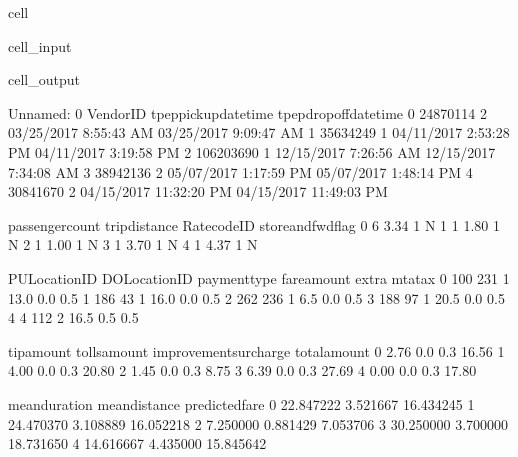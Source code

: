 \documentclass[letterpaper,10pt,english]{sphinxmanual}
\begin{document}
\begin{sphinxuseclass}{cell}
\begin{sphinxuseclass}{cell_input}
\begin{sphinxVerbatim}[commandchars=\\\{\}]
\end{sphinxVerbatim}

\end{sphinxuseclass}
\begin{sphinxuseclass}{cell_output}
\begin{sphinxVerbatim}[commandchars=\\\{\}]
   Unnamed: 0  VendorID    tpep\PYGZus{}pickup\PYGZus{}datetime   tpep\PYGZus{}dropoff\PYGZus{}datetime  \PYGZbs{}
0    24870114         2   03/25/2017 8:55:43 AM   03/25/2017 9:09:47 AM   
1    35634249         1   04/11/2017 2:53:28 PM   04/11/2017 3:19:58 PM   
2   106203690         1   12/15/2017 7:26:56 AM   12/15/2017 7:34:08 AM   
3    38942136         2   05/07/2017 1:17:59 PM   05/07/2017 1:48:14 PM   
4    30841670         2  04/15/2017 11:32:20 PM  04/15/2017 11:49:03 PM   

   passenger\PYGZus{}count  trip\PYGZus{}distance  RatecodeID store\PYGZus{}and\PYGZus{}fwd\PYGZus{}flag  \PYGZbs{}
0                6           3.34           1                  N   
1                1           1.80           1                  N   
2                1           1.00           1                  N   
3                1           3.70           1                  N   
4                1           4.37           1                  N   

   PULocationID  DOLocationID  payment\PYGZus{}type  fare\PYGZus{}amount  extra  mta\PYGZus{}tax  \PYGZbs{}
0           100           231             1         13.0    0.0      0.5   
1           186            43             1         16.0    0.0      0.5   
2           262           236             1          6.5    0.0      0.5   
3           188            97             1         20.5    0.0      0.5   
4             4           112             2         16.5    0.5      0.5   

   tip\PYGZus{}amount  tolls\PYGZus{}amount  improvement\PYGZus{}surcharge  total\PYGZus{}amount  \PYGZbs{}
0        2.76           0.0                    0.3         16.56   
1        4.00           0.0                    0.3         20.80   
2        1.45           0.0                    0.3          8.75   
3        6.39           0.0                    0.3         27.69   
4        0.00           0.0                    0.3         17.80   

   mean\PYGZus{}duration  mean\PYGZus{}distance  predicted\PYGZus{}fare  
0      22.847222       3.521667       16.434245  
1      24.470370       3.108889       16.052218  
2       7.250000       0.881429        7.053706  
3      30.250000       3.700000       18.731650  
4      14.616667       4.435000       15.845642  
\end{sphinxVerbatim}

\end{sphinxuseclass}
\end{sphinxuseclass}
\end{document}
